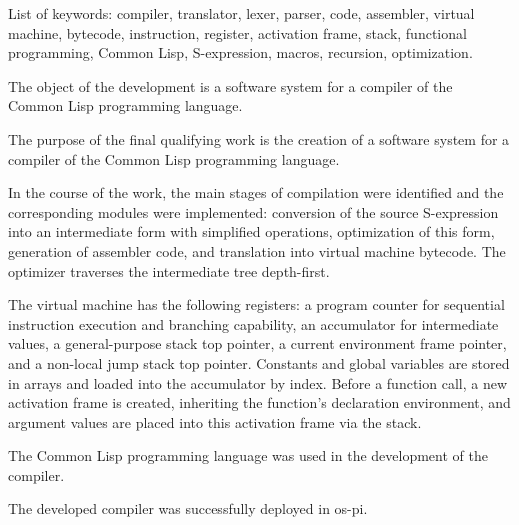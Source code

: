 List of keywords: compiler, translator, lexer, parser, code, assembler, virtual machine, bytecode, instruction, register, activation frame, stack, functional programming, Common Lisp, S-expression, macros, recursion, optimization.

The object of the development is a software system for a compiler of the Common Lisp programming language.

The purpose of the final qualifying work is the creation of a software system for a compiler of the Common Lisp programming language.

In the course of the work, the main stages of compilation were identified and the corresponding modules were implemented: conversion of the source S-expression into an intermediate form with simplified operations, optimization of this form, generation of assembler code, and translation into virtual machine bytecode. The optimizer traverses the intermediate tree depth-first.

The virtual machine has the following registers: a program counter for sequential instruction execution and branching capability, an accumulator for intermediate values, a general-purpose stack top pointer, a current environment frame pointer, and a non-local jump stack top pointer. Constants and global variables are stored in arrays and loaded into the accumulator by index. Before a function call, a new activation frame is created, inheriting the function's declaration environment, and argument values are placed into this activation frame via the stack.

The Common Lisp programming language was used in the development of the compiler.

The developed compiler was successfully deployed in os-pi.
